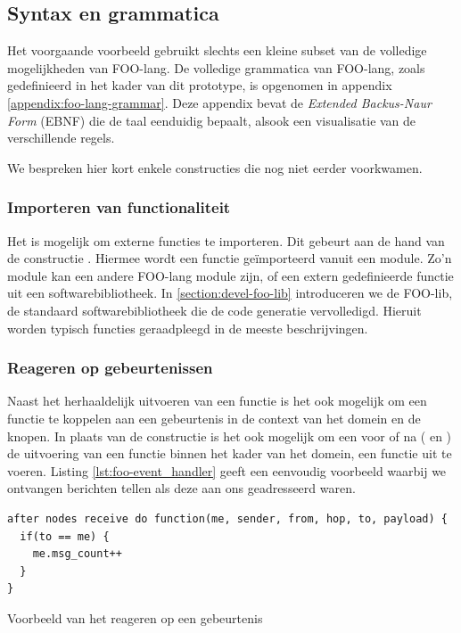 \subsection{Syntax en grammatica}
\label{subsection:devel-foo-lang-grammar}

Het voorgaande voorbeeld gebruikt slechts een kleine subset van de volledige
mogelijkheden van FOO-lang. De volledige grammatica van FOO-lang, zoals
gedefinieerd in het kader van dit prototype, is opgenomen in appendix
\ref{appendix:foo-lang-grammar}. Deze appendix bevat de \emph{Extended
Backus-Naur Form} (EBNF) die de taal eenduidig bepaalt, alsook een visualisatie
van de verschillende regels.

We bespreken hier kort enkele constructies die nog niet eerder voorkwamen.

\subsubsection{Importeren van functionaliteit}

Het is mogelijk om externe functies te importeren. Dit gebeurt aan de hand van
de constructie . Hiermee wordt een functie
ge\"importeerd vanuit een module. Zo'n module kan een andere FOO-lang module
zijn, of een extern gedefinieerde functie uit een softwarebibliotheek. In
\ref{section:devel-foo-lib} introduceren we de FOO-lib, de standaard
softwarebibliotheek die de code generatie vervolledigd. Hieruit worden typisch
functies geraadpleegd in de meeste beschrijvingen.

\subsubsection{Reageren op gebeurtenissen}

Naast het herhaaldelijk uitvoeren van een functie is het ook mogelijk om een
functie te koppelen aan een gebeurtenis in de context van het domein en de
knopen. In plaats van de  constructie is het ook mogelijk om
een voor of na ( en ) de uitvoering van een functie
binnen het kader van het domein, een functie uit te voeren. Listing
\ref{lst:foo-event_handler} geeft een eenvoudig voorbeeld waarbij we ontvangen
berichten tellen als deze aan ons geadresseerd waren.

\begin{listing}[ht]
  \begin{verbatim}
after nodes receive do function(me, sender, from, hop, to, payload) {
  if(to == me) {
    me.msg_count++
  }
}
  \end{verbatim}
  \vspace{-5mm}
  \caption{Voorbeeld van het reageren op een gebeurtenis}
  \label{lst:foo-event_handler}
\end{listing}

